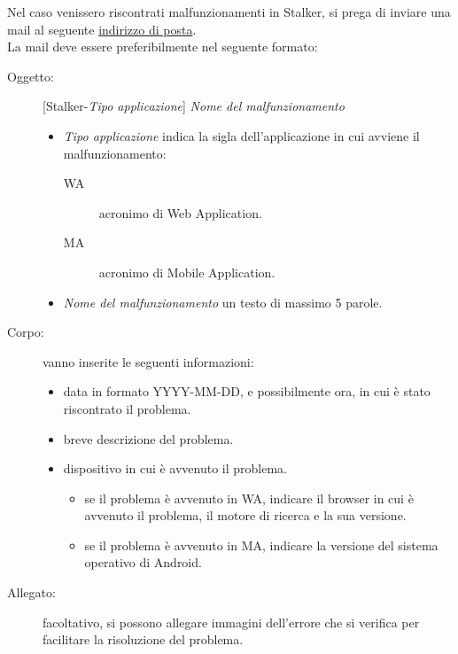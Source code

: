\documentclass[../manuale-utente.tex]{subfiles}
\begin{document}
Nel caso venissero riscontrati malfunzionamenti in Stalker, si prega di inviare una mail al seguente \href{mailto:gruppone.swe@gmail.com}{indirizzo di posta}.\\ 
La mail deve essere preferibilmente nel seguente formato:
\begin{description}
    \item[Oggetto:] [Stalker-\textit{Tipo applicazione}] \textit{Nome del malfunzionamento}
    \begin{itemize}
        \item \textit{Tipo applicazione} indica la sigla dell'applicazione in cui avviene il malfunzionamento:
        \begin{description}
            \item[WA] acronimo di Web Application.
            \item[MA] acronimo di Mobile Application.
        \end{description}
        \item \textit{Nome del malfunzionamento} un testo di massimo 5 parole.
    \end{itemize}
    
    \item[Corpo:] vanno inserite le seguenti informazioni:
    \begin{itemize}
        \item data in formato YYYY-MM-DD, e possibilmente ora, in cui è stato riscontrato il problema.
        \item breve descrizione del problema.
        \item dispositivo in cui è avvenuto il problema.
        \begin{itemize}
            \item se il problema è avvenuto in WA, indicare il browser in cui è avvenuto il problema, il motore di ricerca e la sua versione.
            \item se il problema è avvenuto in MA, indicare la versione del sistema operativo di Android.
        \end{itemize}
    \end{itemize} 

    \item[Allegato:] facoltativo, si possono allegare immagini dell'errore che si verifica per facilitare la risoluzione del problema. 
\end{description}
\end{document}

